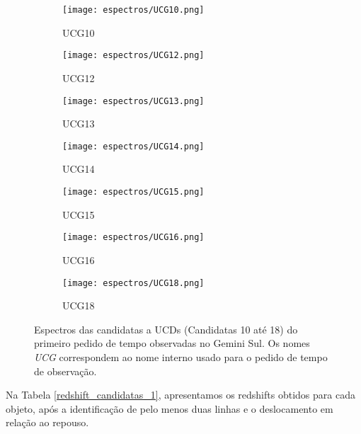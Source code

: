 \begin{figure}[H]
    \centering
    \begin{subfigure}[b]{0.45\textwidth}
        \texttt{[image: espectros/UCG10.png]}
        \caption{UCG10}
    \end{subfigure}
    \begin{subfigure}[b]{0.45\textwidth}
        \texttt{[image: espectros/UCG12.png]}
        \caption{UCG12}
    \end{subfigure}
    \begin{subfigure}[b]{0.45\textwidth}
        \texttt{[image: espectros/UCG13.png]}
        \caption{UCG13}
    \end{subfigure}
    \begin{subfigure}[b]{0.45\textwidth}
        \texttt{[image: espectros/UCG14.png]}
        \caption{UCG14}
    \end{subfigure}
    \begin{subfigure}[b]{0.45\textwidth}
        \texttt{[image: espectros/UCG15.png]}
        \caption{UCG15}
    \end{subfigure}
    \begin{subfigure}[b]{0.45\textwidth}
        \texttt{[image: espectros/UCG16.png]}
        \caption{UCG16}
    \end{subfigure}
    \begin{subfigure}[b]{0.45\textwidth}
        \texttt{[image: espectros/UCG18.png]}
        \caption{UCG18}
    \end{subfigure}
    \caption{Espectros das candidatas a UCDs (Candidatas 10 até 18) do primeiro pedido de tempo observadas no Gemini Sul. Os nomes \textit{UCG} correspondem ao nome interno usado para o pedido de tempo de observação.}
    \label{espectros_candidatas_1_p2}
\end{figure}

Na Tabela \ref{redshift_candidatas_1}, apresentamos os redshifts obtidos para cada objeto, após a identificação de pelo menos duas linhas e o deslocamento em relação ao repouso.


